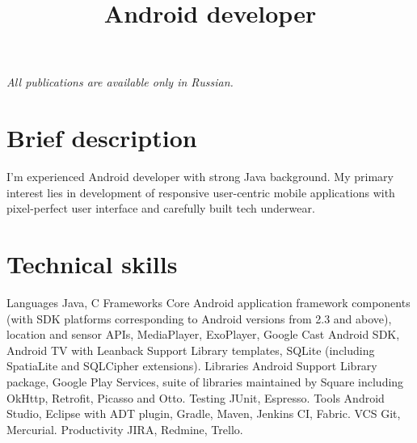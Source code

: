 
\makeatletter
\renewcommand*{\quotefont}{\normalfont}
\renewcommand*{\quotestyle}[1]{{\quotefont\textcolor{color2}{#1}}}
\makeatother

\makeatletter
\renewcommand\@makefnmark{\hbox{\@textsuperscript{\normalfont\color{color2}\@thefnmark}}}
\makeatother

\renewcommand*{\mobilephonesymbol}{\fixedphonesymbol}
\apptocmd
    {\bibliographyhead}
    {\cvline
        {}
        {\textit{All publications are available only in Russian.}\smallskip}
    }
    {}{}
    

\title{Android developer}
\address{Kyiv, Ukraine}



\makecvtitle

\section{Brief description}
\cvline
    {}
    {I'm experienced Android developer with strong Java background. My primary 
    interest lies in development of responsive user-centric mobile applications 
    with pixel-perfect user interface and carefully built tech underwear.}


\medskip
\section{Technical skills}
\cvitem
    {Languages}
    {Java, C}
\cvitem
    {Frameworks}
    {Core Android application framework components (with SDK platforms 
    corresponding to Android versions from 2.3 and above), location and 
	sensor APIs, MediaPlayer, ExoPlayer, Google Cast Android SDK, 
	Android TV with Leanback Support Library templates, 
	SQLite (including SpatiaLite and SQLCipher extensions).}
\cvitem
    {Libraries}
    {Android Support Library package, Google Play Services, suite of libraries 
    maintained by Square including OkHttp, Retrofit, Picasso and Otto.}
\cvitem
    {Testing}
    {JUnit, Espresso.}
\cvitem
    {Tools}
    {Android Studio, Eclipse with ADT plugin, Gradle, Maven, Jenkins CI, 
    Fabric.}
\cvitem
    {VCS}
    {Git, Mercurial.}
\cvitem
    {Productivity}
    {JIRA, Redmine, Trello.}
    

